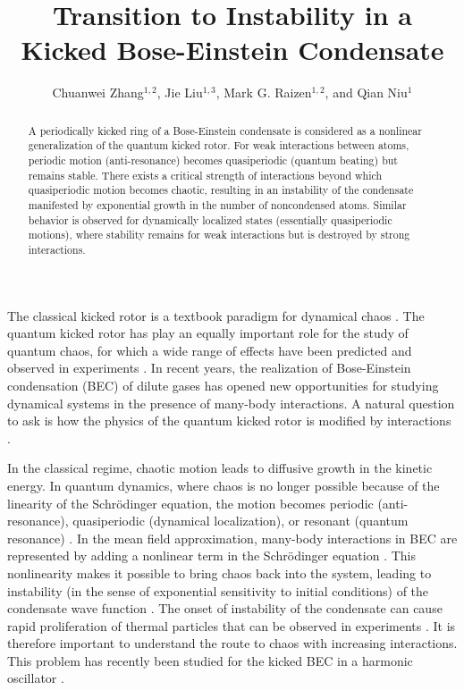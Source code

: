 \documentclass[twocolumn,prl,aps,showpacs]{revtex4}
\begin{document}
\title{Transition to Instability in a Kicked 
Bose-Einstein Condensate}
\author{Chuanwei Zhang$^{1,2}$, Jie Liu$^{1,3}$, Mark G. Raizen$^{1,2}$, and Qian Niu$^1$}
\begin{abstract}
A periodically kicked ring of a Bose-Einstein condensate is
considered as a nonlinear generalization of the
quantum kicked rotor.  For weak interactions between atoms, periodic motion (anti-resonance) 
becomes quasiperiodic (quantum beating) but remains stable. There exists a critical strength of 
interactions beyond which quasiperiodic motion becomes chaotic, resulting in an instability
of the condensate manifested by exponential growth in the number of noncondensed atoms.
Similar behavior is observed for dynamically localized states (essentially quasiperiodic motions), where stability
remains for weak interactions but is destroyed by strong interactions.   


\end{abstract}
\address{$^1$Department of Physics, The University of Texas, Austin, Texas 78712-1081\\
$^2$Center for Nonlinear Dynamics, The University of Texas, Austin, Texas 78712-1081\\
$^3$Institute of Applied Physics and Computational Mathematics, P.O.Box 100088, Beijing, P. R. China}
\maketitle
The classical kicked rotor is a textbook paradigm for dynamical chaos \cite{reichl}. 
The quantum kicked rotor has play an equally important role for the study of quantum chaos, for which a wide range of effects
have been predicted \cite{QKR} and observed in experiments \cite{raizen}. In recent years, the realization of Bose-Einstein 
condensation (BEC) of dilute gases \cite{BEC} has opened new opportunities for studying dynamical systems in the presence of many-body interactions.
A natural question to ask is how the physics of the quantum kicked rotor is modified by interactions \cite{NLSE}.

In the classical regime, chaotic motion leads to diffusive growth in the kinetic energy. In quantum dynamics, 
where chaos is no longer possible because of the linearity of the Schr\"{o}dinger equation, the motion becomes 
periodic (anti-resonance), quasiperiodic (dynamical localization), or resonant (quantum resonance) \cite{hog,anti-res}. 
In the mean field approximation, many-body interactions in BEC are represented by adding a nonlinear term 
in the Schr\"{o}dinger equation \cite{review}. This nonlinearity makes it possible to bring chaos back into the system,
leading to instability (in the sense of exponential sensitivity to initial conditions) 
of the condensate wave function \cite{instability}. The onset of instability of the condensate can 
cause rapid proliferation of thermal particles \cite{castin} that can be observed in experiments \cite{ketterle}. 
It is therefore important to understand the route to chaos with increasing interactions. This problem has recently been 
studied for the kicked BEC in a harmonic oscillator \cite{zoller}. 
\end{document}
